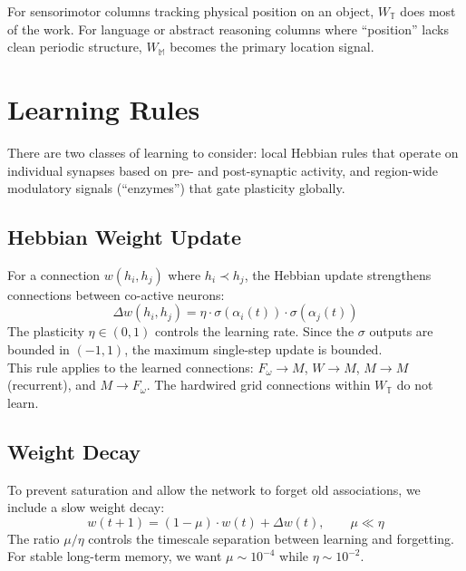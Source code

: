 \documentclass[11pt]{article}
\begin{document}
For sensorimotor columns tracking physical position on an object, $W_\mathbb{T}$ does most of the work. For language or abstract reasoning columns where ``position'' lacks clean periodic structure, $W_\mathbb{M}$ becomes the primary location signal.


\section{Learning Rules}\label{sec:learning}
There are two classes of learning to consider: local Hebbian rules that operate on individual synapses based on pre- and post-synaptic activity, and region-wide modulatory signals (``enzymes'') that gate plasticity globally.

\subsection{Hebbian Weight Update}
For a connection $w(h_i, h_j)$ where $h_i \prec h_j$, the Hebbian update strengthens connections between co-active neurons:
\begin{equation}\label{eq:hebb}
    \Delta w(h_i, h_j) = \eta \cdot \sigma(\alpha_i(t)) \cdot \sigma(\alpha_j(t))
\end{equation}
The plasticity $\eta \in (0, 1)$ controls the learning rate. Since the $\sigma$ outputs are bounded in $(-1, 1)$, the maximum single-step update is bounded.\\

This rule applies to the learned connections: $F_\omega \to M$, $W \to M$, $M \to M$ (recurrent), and $M \to F_\omega$. The hardwired grid connections within $W_\mathbb{T}$ do not learn.

\subsection{Weight Decay}
To prevent saturation and allow the network to forget old associations, we include a slow weight decay:
\begin{equation}
    w(t+1) = (1 - \mu) \cdot w(t) + \Delta w(t), \qquad \mu \ll \eta
\end{equation}
The ratio $\mu / \eta$ controls the timescale separation between learning and forgetting. For stable long-term memory, we want $\mu \sim 10^{-4}$ while $\eta \sim 10^{-2}$.
\end{document}
